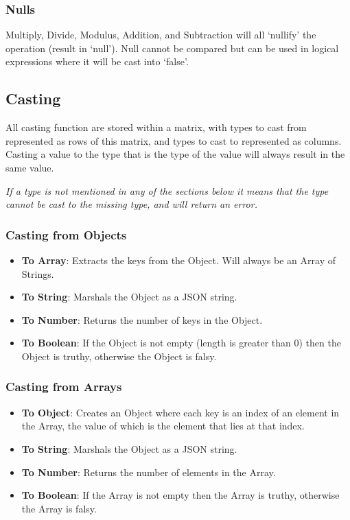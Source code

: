 \subsubsection{Nulls}

Multiply, Divide, Modulus, Addition, and Subtraction will all `nullify' the operation (result in `null'). Null cannot be compared but can be used in logical expressions where it will be cast into `false'.

\subsection{Casting}

All casting function are stored within a matrix, with types to cast from represented as rows of this matrix, and types to cast to represented as columns. Casting a value to the type that is the type of the value will always result in the same value.

\begin{center}
\textit{If a type is not mentioned in any of the sections below it means that the type cannot be cast to the missing type, and will return an error.}
\end{center}

\subsubsection{Casting from Objects}

\begin{itemize}
    \item \textbf{To Array}: Extracts the keys from the Object. Will always be an Array of Strings.
    \item \textbf{To String}: Marshals the Object as a JSON string.
    \item \textbf{To Number}: Returns the number of keys in the Object.
    \item \textbf{To Boolean}: If the Object is not empty (length is greater than 0) then the Object is truthy, otherwise the Object is falsy.
\end{itemize}

\subsubsection{Casting from Arrays}

\begin{itemize}
    \item \textbf{To Object}: Creates an Object where each key is an index of an element in the Array, the value of which is the element that lies at that index.
    \item \textbf{To String}: Marshals the Object as a JSON string.
    \item \textbf{To Number}: Returns the number of elements in the Array.
    \item \textbf{To Boolean}: If the Array is not empty then the Array is truthy, otherwise the Array is falsy.
\end{itemize}


